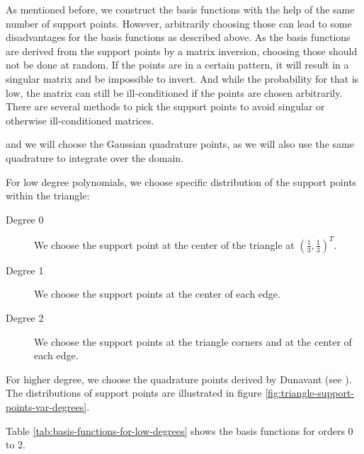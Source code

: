 \documentclass[a4paper, twoside]{article}
\begin{document}
As mentioned before, we construct the basis functions with the help of the same number of support points. However, arbitrarily choosing those can lead to some disadvantages for the basis functions as described above. As the basis functions are derived from the support points by a matrix inversion, choosing those should not be done at random. If the points are in a certain pattern, it will result in a singular matrix and be impossible to invert. And while the probability for that is low, the matrix can still be ill-conditioned if the points are chosen arbitrarily. There are several methods to pick the support points to avoid singular or otherwise ill-conditioned matrices.

and we will choose the Gaussian quadrature points, as we will also use the same quadrature to integrate over the domain.

For low degree polynomials, we choose specific distribution of the support points within the triangle:
\begin{description}
\item[Degree 0] We choose the support point at the center of the triangle at $\left(\frac{1}{3}, \frac{1}{3}\right)^T$.
\item[Degree 1] We choose the support points at the center of each edge.
\item[Degree 2] We choose the support points at the triangle corners and at the center of each edge.
\end{description}

For higher degree, we choose the quadrature points derived by Dunavant (see \cite{dunavant1985high}). The distributions of support points are illustrated in figure \ref{fig:triangle-support-points-var-degrees}.

Table \ref{tab:basis-functions-for-low-degrees} shows the basis functions for orders 0 to 2.
\end{document}
